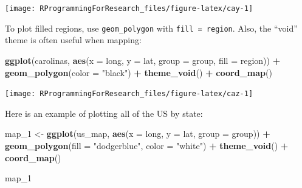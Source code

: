 \documentclass[]{book}
\makeatletter
\newenvironment{Shaded}{\begin{snugshade}}{\end{snugshade}}
\newcommand{\KeywordTok}[1]{\textcolor[rgb]{0.13,0.29,0.53}{\textbf{#1}}}
\newcommand{\DataTypeTok}[1]{\textcolor[rgb]{0.13,0.29,0.53}{#1}}
\newcommand{\DecValTok}[1]{\textcolor[rgb]{0.00,0.00,0.81}{#1}}
\newcommand{\StringTok}[1]{\textcolor[rgb]{0.31,0.60,0.02}{#1}}
\newcommand{\OperatorTok}[1]{\textcolor[rgb]{0.81,0.36,0.00}{\textbf{#1}}}
\newcommand{\NormalTok}[1]{#1}
\newenvironment{kframe}{%
\medskip{}
\setlength{\fboxsep}{.8em}
 \def\at@end@of@kframe{}%
 \ifinner\ifhmode%
  \def\at@end@of@kframe{\end{minipage}}%
  \begin{minipage}{\columnwidth}%
 \fi\fi%
 \def\FrameCommand##1{\hskip\@totalleftmargin \hskip-\fboxsep
 \colorbox{shadecolor}{##1}\hskip-\fboxsep
     \hskip-\linewidth \hskip-\@totalleftmargin \hskip\columnwidth}%
 \MakeFramed {\advance\hsize-\width
   \@totalleftmargin\z@ \linewidth\hsize
   \@setminipage}}%
 {\par\unskip\endMakeFramed%
 \at@end@of@kframe}
\renewenvironment{Shaded}{\begin{kframe}}{\end{kframe}}
\theoremstyle{definition}
\theoremstyle{definition}
\theoremstyle{definition}
\theoremstyle{remark}
\makeatother
\begin{document}
\begin{center}\texttt{[image: RProgrammingForResearch\_files/figure-latex/cay-1]} \end{center}

To plot filled regions, use \texttt{geom\_polygon} with
\texttt{fill\ =\ region}. Also, the ``void'' theme is often useful when
mapping:

\begin{Shaded}
\begin{Highlighting}[]
\KeywordTok{ggplot}\NormalTok{(carolinas, }\KeywordTok{aes}\NormalTok{(}\DataTypeTok{x =}\NormalTok{ long, }\DataTypeTok{y =}\NormalTok{ lat,}
                      \DataTypeTok{group =}\NormalTok{ group,}
                      \DataTypeTok{fill =}\NormalTok{ region)) }\OperatorTok{+}\StringTok{ }
\StringTok{  }\KeywordTok{geom_polygon}\NormalTok{(}\DataTypeTok{color =} \StringTok{"black"}\NormalTok{) }\OperatorTok{+}\StringTok{ }
\StringTok{  }\KeywordTok{theme_void}\NormalTok{() }\OperatorTok{+}\StringTok{ }
\StringTok{  }\KeywordTok{coord_map}\NormalTok{()}
\end{Highlighting}
\end{Shaded}

\begin{center}\texttt{[image: RProgrammingForResearch\_files/figure-latex/caz-1]} \end{center}

Here is an example of plotting all of the US by state:

\begin{Shaded}
\begin{Highlighting}[]
\NormalTok{map_}\DecValTok{1}\NormalTok{ <-}\StringTok{ }\KeywordTok{ggplot}\NormalTok{(us_map, }\KeywordTok{aes}\NormalTok{(}\DataTypeTok{x =}\NormalTok{ long, }\DataTypeTok{y =}\NormalTok{ lat,}
                            \DataTypeTok{group =}\NormalTok{ group)) }\OperatorTok{+}\StringTok{ }
\StringTok{        }\KeywordTok{geom_polygon}\NormalTok{(}\DataTypeTok{fill =} \StringTok{"dodgerblue"}\NormalTok{,}
                     \DataTypeTok{color =} \StringTok{"white"}\NormalTok{) }\OperatorTok{+}
\StringTok{        }\KeywordTok{theme_void}\NormalTok{() }\OperatorTok{+}\StringTok{ }
\StringTok{  }\KeywordTok{coord_map}\NormalTok{()}
\end{Highlighting}
\end{Shaded}

\begin{Shaded}
\begin{Highlighting}[]
\NormalTok{map_}\DecValTok{1}
\end{Highlighting}
\end{Shaded}
\end{document}
